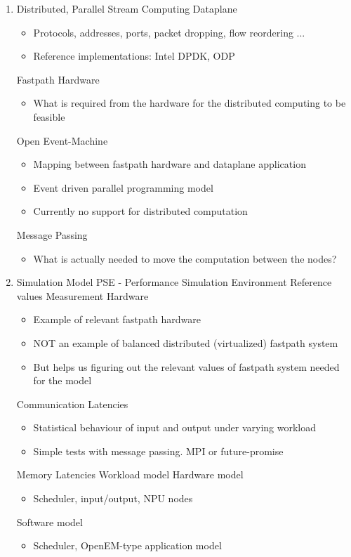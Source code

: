 \begin{enumerate}
\item Distributed, Parallel Stream Computing
  \subitem Dataplane
  \begin{itemize}[leftmargin=45px]
    \item Protocols, addresses, ports, packet dropping, flow reordering ...
    \item Reference implementations: Intel DPDK, ODP
  \end{itemize}
  \subitem Fastpath Hardware
  \begin{itemize}[leftmargin=45px]
    \item What is required from the hardware for the distributed computing to be feasible
  \end{itemize}
  \subitem Open Event-Machine
  \begin{itemize}[leftmargin=45px]
    \item Mapping between fastpath hardware and dataplane application
    \item Event driven parallel programming model
    \item Currently no support for distributed computation
  \end{itemize}
  \subitem Message Passing
  \begin{itemize}[leftmargin=45px]
    \item What is actually needed to move the computation between the nodes?
  \end{itemize}

\item Simulation Model
  \subitem PSE - Performance Simulation Environment
  \subitem Reference values
    \subsubitem Measurement Hardware
    \begin{itemize}[leftmargin=45px]
      \item Example of relevant fastpath hardware
      \item NOT an example of balanced distributed (virtualized) fastpath system
      \item But helps us figuring out the relevant values of fastpath system needed for the model
    \end{itemize}
    \subsubitem Communication Latencies
    \begin{itemize}[leftmargin=45px]
      \item Statistical behaviour of input and output under varying workload
      \item Simple tests with message passing. MPI or future-promise
    \end{itemize}
    \subsubitem Memory Latencies
  \subitem Workload model
  \subitem Hardware model
  \begin{itemize}[leftmargin=45px]
    \item Scheduler, input/output, NPU nodes
  \end{itemize}
  \subitem Software model
  \begin{itemize}[leftmargin=45px]
    \item Scheduler, OpenEM-type application model
  \end{itemize}


\end{enumerate}

